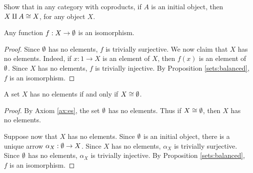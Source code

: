 \begin{exercise} Show that in any category with coproducts, if $A$ is
  an initial object, then $X\amalg A\cong X$, for any object
  $X$. \end{exercise}


\begin{prop} Any function $f:X\to\emptyset$ is an isomorphism. \end{prop}

\begin{proof} Since $\emptyset$ has no elements, $f$ is trivially
  surjective.  We now claim that $X$ has no elements.  Indeed, if
  $x:1\to X$ is an element of $X$, then $f(x)$ is an element of $\emptyset$.
  Since $X$ has no elements, $f$ is trivially injective.  By
  Proposition \ref{sets:balanced}, $f$ is an isomorphism. \end{proof}

\begin{prop} A set $X$ has no elements if and only if $X\cong
  \emptyset$. \label{empty-init} \end{prop}

\begin{proof} By Axiom \ref{ax:es}, the set $\emptyset$ has no elements.
  Thus if $X\cong\emptyset$, then $X$ has no elements.

  Suppose now that $X$ has no elements.  Since $\emptyset$ is an initial
  object, there is a unique arrow $\alpha _X:\emptyset\to X$.  Since $X$ has
  no elements, $\alpha _X$ is trivially surjective.  Since $\emptyset$ has
  no elements, $\alpha _X$ is trivially injective.  By Proposition
  \ref{sets:balanced}, $f$ is an isomorphism. \end{proof}







